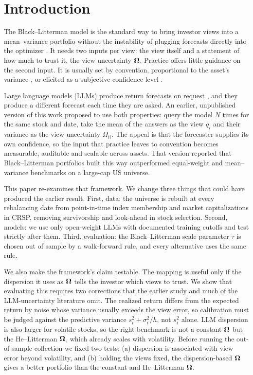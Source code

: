 \section{Introduction}\label{sec:intro}

The Black--Litterman model \citep{black1992global} is the standard way to bring investor views into a mean--variance portfolio without the instability of plugging forecasts directly into the optimizer \citep{best1991sensitivity,chopra1993effect}. It needs two inputs per view: the view itself and a statement of how much to trust it, the view uncertainty $\bm{\Omega}$. Practice offers little guidance on the second input. It is usually set by convention, proportional to the asset's variance \citep{he2002intuition}, or elicited as a subjective confidence level \citep{idzorek2007step}.

Large language models (LLMs) produce return forecasts on request \citep{lopez2023can,kim2023if}, and they produce a different forecast each time they are asked. An earlier, unpublished version of this work proposed to use both properties: query the model $N$ times for the same stock and date, take the mean of the answers as the view $q_i$ and their variance as the view uncertainty $\Omega_{ii}$. The appeal is that the forecaster supplies its own confidence, so the input that practice leaves to convention becomes measurable, auditable and scalable across assets. That version reported that Black--Litterman portfolios built this way outperformed equal-weight and mean--variance benchmarks on a large-cap US universe.

This paper re-examines that framework. We change three things that could have produced the earlier result. First, data: the universe is rebuilt at every rebalancing date from point-in-time index membership and market capitalizations in CRSP, removing survivorship and look-ahead in stock selection. Second, models: we use only open-weight LLMs with documented training cutoffs and test strictly after them. Third, evaluation: the Black--Litterman scale parameter $\tau$ is chosen out of sample by a walk-forward rule, and every alternative uses the same rule.

We also make the framework's claim testable. The mapping is useful only if the dispersion it uses as $\bm{\Omega}$ tells the investor which views to trust. We show that evaluating this requires two corrections that the earlier study and much of the LLM-uncertainty literature omit. The realized return differs from the expected return by noise whose variance usually exceeds the view error, so calibration must be judged against the predictive variance $s_i^2+\sigma_i^2/h$, not $s_i^2$ alone. LLM dispersion is also larger for volatile stocks, so the right benchmark is not a constant $\bm{\Omega}$ but the He--Litterman $\bm{\Omega}$, which already scales with volatility. Before running the out-of-sample collection we fixed two tests: (a) dispersion is associated with view error beyond volatility, and (b) holding the views fixed, the dispersion-based $\bm{\Omega}$ gives a better portfolio than the constant and He--Litterman $\bm{\Omega}$.

